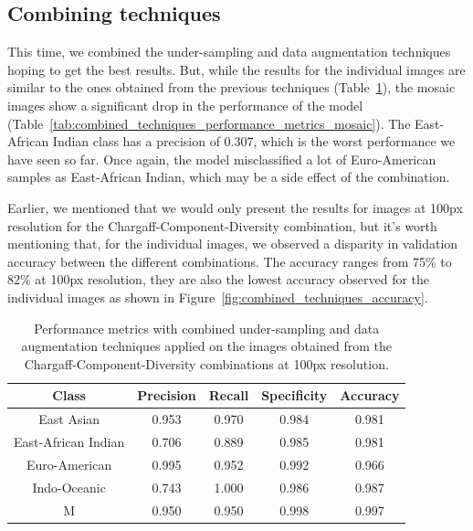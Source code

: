 \subsection{Combining techniques}
\label{subsec:combining_techniques}

\label{subsubsec:results_combining_techniques}

This time, we combined the under-sampling and data augmentation techniques hoping to get the best results. But, while the results for the individual images
are similar to the ones obtained from the previous techniques (Table~\ref{tab:combined_techniques_performance_metrics}), the mosaic images show a significant
drop in the performance of the model (Table~\ref{tab:combined_techniques_performance_metrics_mosaic}). The East-African Indian class has a precision of 0.307,
which is the worst performance we have seen so far. Once again, the model misclassified a lot of Euro-American samples as East-African Indian, which may be a
side effect of the combination.

Earlier, we mentioned that we would only present the results for images at 100px resolution for the Chargaff-Component-Diversity combination, but it's worth
mentioning that, for the individual images, we observed a disparity in validation accuracy between the different combinations. The accuracy ranges from 75\%
to 82\% at 100px resolution, they are also the lowest accuracy observed for the individual images as shown in Figure~\ref{fig:combined_techniques_accuracy}.

\begin{table}[H]
	\centering
	\begin{tabular}{|c|c|c|c|c|}
		\hline
		\textbf{Class}      & \textbf{Precision} & \textbf{Recall} & \textbf{Specificity} & \textbf{Accuracy} \\
		\hline
		East Asian          & 0.953              & 0.970           & 0.984                & 0.981             \\
		East-African Indian & 0.706              & 0.889           & 0.985                & 0.981             \\
		Euro-American       & 0.995              & 0.952           & 0.992                & 0.966             \\
		Indo-Oceanic        & 0.743              & 1.000           & 0.986                & 0.987             \\
		M                   & 0.950              & 0.950           & 0.998                & 0.997             \\
		\hline
	\end{tabular}
	\caption{Performance metrics with combined under-sampling and data augmentation techniques applied on the images obtained from the
		Chargaff-Component-Diversity combinations at 100px resolution.}
	\label{tab:combined_techniques_performance_metrics}
\end{table}

